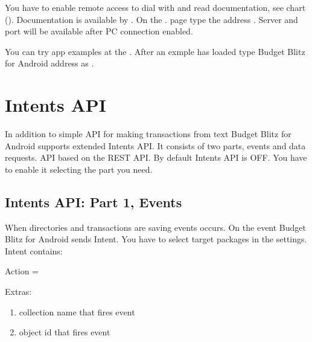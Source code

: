 \documentclass[a4paper,10pt,english]{sphinxmanual}
\begin{document}
\sphinxAtStartPar
You have to enable remote access to dial with  and read documentation, see chart {\hyperref[\detokenize{remote-access:chapter-remote-access}]{}} ().
Documentation is available by . On the . page type the address  .
Server and port will be available after PC connection enabled.

\sphinxAtStartPar
You can try app examples at the . After an exmple has loaded type Budget Blitz for Android address as .


\section{Intents API}
\label{\detokenize{api:intents-api}}
\sphinxAtStartPar
In addition to simple API for making transactions from text Budget Blitz for Android supports extended Intents API. It consists of two parts,
events and data requests. API based on the REST API. By default Intents API is OFF. You have to enable it
selecting the part you need.


\subsection{Intents API: Part 1, Events}
\label{\detokenize{api:intents-api-part-1-events}}
\sphinxAtStartPar
When directories and transactions are saving events occurs. On the event Budget Blitz for Android sends Intent. You have to select target
packages in the settings. Intent contains:

\sphinxAtStartPar
Action = 

\sphinxAtStartPar
Extras:
\begin{enumerate}
%
\item {} 
\sphinxAtStartPar
{} \sphinxhyphen{} collection name that fires event

\item {} 
\sphinxAtStartPar
{} \sphinxhyphen{} object id that fires event

\end{enumerate}
\end{document}
